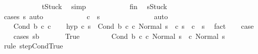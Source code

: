 \begin{isabellebody}
\ \ \ \ \ \ \ \ \ \ \isamarkupfalse%
\ {\isachardoublequoteopen}t{\isacharequal}Stuck{\isachardoublequoteclose}\ \isamarkupfalse%
\ simp\isanewline
\ \ \ \ \ \ \ \ \ \ \isamarkupfalse%
\ fin\ \isamarkupfalse%
\ {\isachardoublequoteopen}s{\isacharprime}{\isacharequal}Stuck{\isachardoublequoteclose}\isanewline
\ \ \ \ \ \ \ \ \ \ \ \ \isamarkupfalse%
\ {\isacharparenleft}cases\ s{\isacharprime}{\isacharparenright}\ auto\isanewline
\ \ \ \ \ \ \ \ \ \ \isamarkupfalse%
\ {\isachardoublequoteopen}{\isasymGamma}{\isasymturnstile}c\ {\isasymdown}\ s{\isacharprime}{\isachardoublequoteclose}\ \isanewline
\ \ \ \ \ \ \ \ \ \ \ \ \isamarkupfalse%
\ auto\isanewline
\ \ \ \ \ \ \ \ \isamarkupfalse%
\isanewline
\ \ \ \ \ \ \isamarkupfalse%
\isanewline
\ \ \ \ \isamarkupfalse%
\isanewline
\ \ \isamarkupfalse%
\isanewline
{}\isamarkupfalse%
\isanewline
\ \ \isamarkupfalse%
\ {\isacharparenleft}Cond\ b\ c\ c\isanewline
\ \ \isamarkupfalse%
\ hyp{\isacharcolon}\ {\isachardoublequoteopen}{\isasymAnd}c{\isacharprime}\ s{\isacharprime}{\isachardot}\ {\isasymGamma}{\isasymturnstile}\ {\isacharparenleft}Cond\ b\ c\ c\ Normal\ s{\isacharparenright}\ {\isasymrightarrow}\ {\isacharparenleft}c{\isacharprime}{\isacharcomma}\ s{\isacharprime}{\isacharparenright}\ {\isasymLongrightarrow}\ {\isasymGamma}{\isasymturnstile}c{\isacharprime}\ {\isasymdown}\ s{\isacharprime}{\isachardoublequoteclose}\ \isamarkupfalse%
\ fact\isanewline
\ \ \isamarkupfalse%
\ {\isacharquery}case\isanewline
\ \ \isamarkupfalse%
\ {\isacharparenleft}cases\ {\isachardoublequoteopen}s{\isasymin}b{\isachardoublequoteclose}{\isacharparenright}\ \isanewline
\ \ \ \ \isamarkupfalse%
\ True\isanewline
\ \ \ \ \isamarkupfalse%
\ \isamarkupfalse%
\ {\isachardoublequoteopen}{\isasymGamma}{\isasymturnstile}\ {\isacharparenleft}Cond\ b\ c\ c\ Normal\ s{\isacharparenright}\ {\isasymrightarrow}\ {\isacharparenleft}c\ Normal\ s{\isacharparenright}{\isachardoublequoteclose}\isanewline
\ \ \ \ \ \ \isamarkupfalse%
\ {\isacharparenleft}rule\ step{\isachardot}CondTrue{\isacharparenright}\isanewline

\end{isabellebody}
